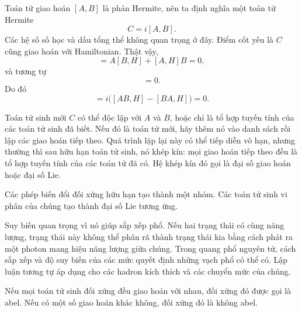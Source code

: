 Toán tử giao hoán \([A,B]\) là phản Hermite, nên ta định nghĩa một toán tử Hermite
\begin{equation}
C=i[A,B].
\end{equation}
Các hệ số số học và dấu tổng thể không quan trọng ở đây. Điểm cốt yếu là \(C\) cũng giao hoán với Hamiltonian. Thật vậy,
\begin{equation}
[AB,H]
=A[B,H]+[A,H]B=0,
\end{equation}
và tương tự
\begin{equation}
[BA,H]=0.
\end{equation}
Do đó
\begin{equation}
[C,H]
=i\bigl([AB,H]-[BA,H]\bigr)=0.
\end{equation}

Toán tử sinh mới \(C\) có thể độc lập với \(A\) và \(B\), hoặc chỉ là tổ hợp tuyến tính của các toán tử sinh đã biết. Nếu đó là toán tử mới, hãy thêm nó vào danh sách rồi lập các giao hoán tiếp theo. Quá trình lặp lại này có thể tiếp diễn vô hạn, nhưng thường thì sau hữu hạn toán tử sinh, nó khép kín: mọi giao hoán tiếp theo đều là tổ hợp tuyến tính của các toán tử đã có. Hệ khép kín đó gọi là đại số giao hoán hoặc đại số Lie.

Các phép biến đổi đối xứng hữu hạn tạo thành một nhóm. Các toán tử sinh vi phân của chúng tạo thành đại số Lie tương ứng.

Suy biến quan trọng vì nó giúp sắp xếp phổ. Nếu hai trạng thái có cùng năng lượng, trạng thái này không thể phân rã thành trạng thái kia bằng cách phát ra một photon mang hiệu năng lượng giữa chúng. Trong quang phổ nguyên tử, cách sắp xếp và độ suy biến của các mức quyết định những vạch phổ có thể có. Lập luận tương tự áp dụng cho các hadron kích thích và các chuyển mức của chúng.

\begin{classroomqa}
\end{classroomqa}

Nếu mọi toán tử sinh đối xứng đều giao hoán với nhau, đối xứng đó được gọi là abel. Nếu có một số giao hoán khác không, đối xứng đó là không abel.

\begin{classroomqa}
\end{classroomqa}

